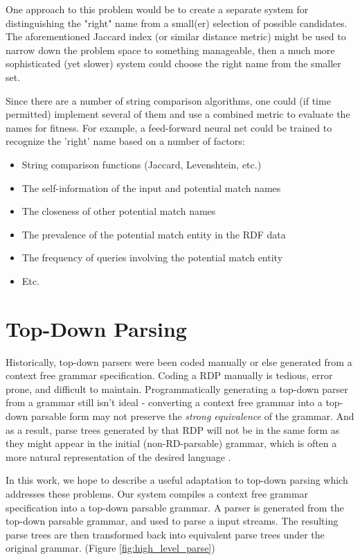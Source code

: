\documentclass[11pt]{article}
\begin{document}
One approach to this problem would be to create a separate
system for distinguishing the "right" name from a small(er) selection
of possible candidates. The aforementioned Jaccard index (or similar
distance metric) might be used to narrow down the problem space
to something manageable, then a much more sophisticated (yet slower)
system could choose the right name from the smaller set.

Since there are a number of string comparison algorithms, one could
(if time permitted) implement several of them and use a combined
metric to evaluate the names for fitness. For example,
a feed-forward neural net could be trained to recognize the 'right'
name based on a number of factors:
\begin{itemize}
\item String comparison functions (Jaccard, Levenshtein, etc.)
\item The self-information \cite{shannon} of the input and potential match names
\item The closeness of other potential match names
\item The prevalence of the potential match entity in the RDF data
\item The frequency of queries involving the potential match entity
\item Etc.
\end{itemize}

\section{Top-Down Parsing}
Historically, top-down parsers were been coded manually or else generated from 
a context free grammar specification. \cite{lewis, formal_langs} 
Coding a RDP manually is tedious, error prone, and difficult to maintain.
Programmatically generating a top-down parser from a grammar
still isn't ideal - converting a context free grammar into
a top-down parsable form may not preserve the {\em strong equivalence} of the grammar.
And as a result, parse trees generated by that RDP will not be in the same form
as they might appear in the initial (non-RD-parsable) grammar, which is often a more 
natural representation of the desired language \cite{compiler}.

In this work, we hope to describe a useful adaptation to top-down parsing
which addresses these problems. Our system compiles a context free grammar 
specification into a top-down parsable grammar.
A parser is generated from the top-down parsable grammar,
and used to parse a input streams. 
The resulting parse trees are then transformed back into equivalent
parse trees under the original grammar. (Figure \ref{fig:high_level_parse})
\end{document}
